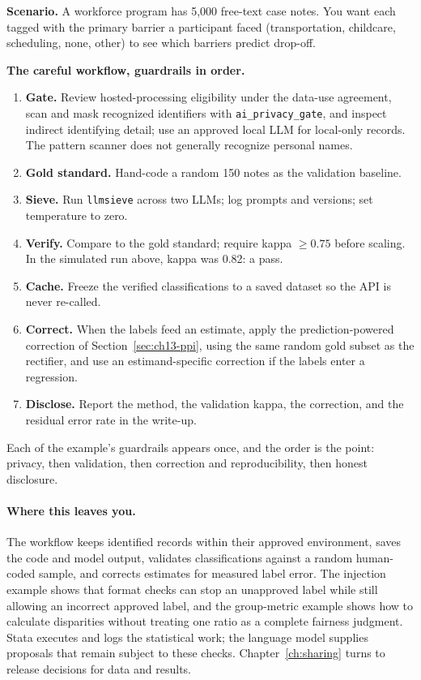 \documentclass[
    a4paper,
    fontsize=10pt,
    twoside=true,
    numbers=noenddot,
]{kaobook}
\newcounter{appliedexample}
\newenvironment{appliedexample}[1][]{%
    \refstepcounter{appliedexample}%
    \begin{appliedexamplebox}[frametitle={Applied Example~\theappliedexample.~~#1}]%
}{%
    \end{appliedexamplebox}%
}
\begin{document}
\begin{appliedexample}[Coding 5,000 progress notes with a reproducible workflow]\label{ae:ch13-notes}
\textbf{Scenario.} A workforce program has 5,000 free-text case notes. You want each tagged with the primary barrier a participant faced (transportation, childcare, scheduling, none, other) to see which barriers predict drop-off.

\medskip
\textbf{The careful workflow, guardrails in order.}
\begin{enumerate}
    \item \textbf{Gate.} Review hosted-processing eligibility under the data-use agreement, scan and mask recognized identifiers with \texttt{ai\_privacy\_gate}, and inspect indirect identifying detail; use an approved local LLM for local-only records. The pattern scanner does not generally recognize personal names.
    \item \textbf{Gold standard.} Hand-code a random 150 notes as the validation baseline.
    \item \textbf{Sieve.} Run \texttt{llmsieve} across two LLMs; log prompts and versions; set temperature to zero.
    \item \textbf{Verify.} Compare to the gold standard; require kappa $\ge 0.75$ before scaling. In the simulated run above, kappa was 0.82: a pass.
    \item \textbf{Cache.} Freeze the verified classifications to a saved dataset so the API is never re-called.
    \item \textbf{Correct.} When the labels feed an estimate, apply the prediction-powered correction of Section~\ref{sec:ch13-ppi}, using the same random gold subset as the rectifier, and use an estimand-specific correction if the labels enter a regression.
    \item \textbf{Disclose.} Report the method, the validation kappa, the correction, and the residual error rate in the write-up.
\end{enumerate}
Each of the example's guardrails appears once, and the order is the point: privacy, then validation, then correction and reproducibility, then honest disclosure.
\end{appliedexample}

\paragraph{Where this leaves you.} The workflow keeps identified records within their approved environment, saves the code and model output, validates classifications against a random human-coded sample, and corrects estimates for measured label error. The injection example shows that format checks can stop an unapproved label while still allowing an incorrect approved label, and the group-metric example shows how to calculate disparities without treating one ratio as a complete fairness judgment. Stata executes and logs the statistical work; the language model supplies proposals that remain subject to these checks. Chapter~\ref{ch:sharing} turns to release decisions for data and results.
\end{document}
